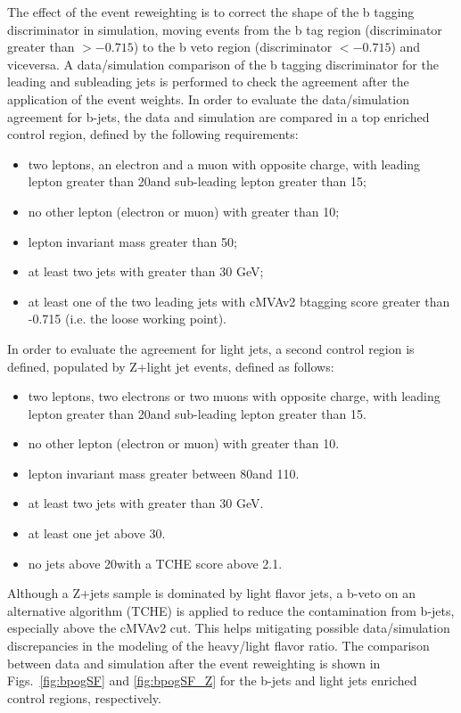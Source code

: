 The effect of the event reweighting is to correct the shape of the b tagging discriminator in simulation, moving events from the b tag region (discriminator greater than $> -0.715$) to the b veto region (discriminator $ < -0.715$) and viceversa. A data/simulation comparison of the b tagging discriminator for the leading and subleading jets is performed to check the agreement after the application of the event weights. In order to evaluate the data/simulation agreement for b-jets, the data and simulation are compared in a top enriched control region, defined by the following requirements:
\begin{itemize}
\item two leptons, an electron and a muon with opposite charge, with
leading lepton \pt greater than 20\GeV and sub-leading lepton \pt greater than
15\GeV;
\item no other lepton (electron or muon) with \pt greater than 10\GeV;
\item lepton invariant mass greater than 50\GeV;
\item at least two jets with \pt greater than 30 GeV;
\item at least one of the two leading jets with cMVAv2 btagging score
greater than -0.715 (i.e. the loose working point).
\end{itemize}
In order to evaluate the agreement for light jets, a second
control region is defined, populated by Z+light jet events, defined as follows:
\begin{itemize}
\item two leptons, two electrons or two muons with opposite charge, with
leading lepton \pt greater than 20\GeV and sub-leading lepton \pt greater than
15\GeV.
\item no other lepton (electron or muon) with \pt greater than 10\GeV.
\item lepton invariant mass greater between 80\GeV and 110\GeV.
\item at least two jets with \pt greater than 30 GeV.
\item at least one jet above 30\GeV.
\item no jets above 20\GeV with a TCHE score above 2.1. 
\end{itemize}
Although a Z+jets sample is dominated by light flavor jets, a b-veto on an
alternative algorithm (TCHE) is applied to reduce the contamination from b-jets,
especially above the cMVAv2 cut.  This helps mitigating possible data/simulation discrepancies in the modeling of the heavy/light flavor ratio.
The comparison between data and simulation after the event reweighting is shown in Figs.~\ref{fig:bpogSF} and \ref{fig:bpogSF_Z} for the b-jets and light jets enriched control regions, respectively.

